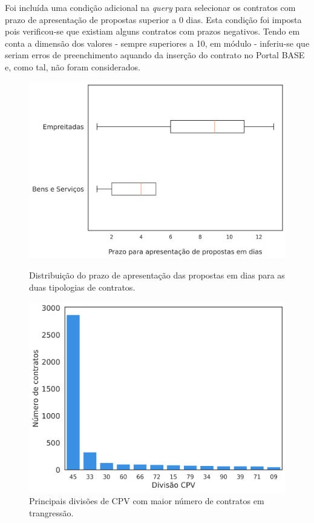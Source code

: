 Foi incluída uma condição adicional na \textit{query} para selecionar os contratos com prazo de apresentação de propostas superior a 0 dias. Esta condição foi imposta pois verificou-se que existiam alguns contratos com prazos negativos. Tendo em conta a dimensão dos valores - sempre superiores a 10, em módulo - inferiu-se que seriam erros de preenchimento aquando da inserção do contrato no Portal BASE e, como tal, não foram considerados. 

\begin{figure}[H]
	\centering
	\begin{minipage}{.48\linewidth}
		\includegraphics[width=\linewidth]{imagens/r003/boxplot_prazos.png}
		\caption{Distribuição do prazo de apresentação das propostas em dias para as duas tipologias de contratos.}
		
	\end{minipage}
	\hfill
	\begin{minipage}{.48\linewidth}
		\includegraphics[width=\linewidth]{imagens/r003/main_cpvs.png}
		\caption{Principais divisões de CPV com maior número de contratos em trangressão.}
		
	\end{minipage}
\end{figure}

